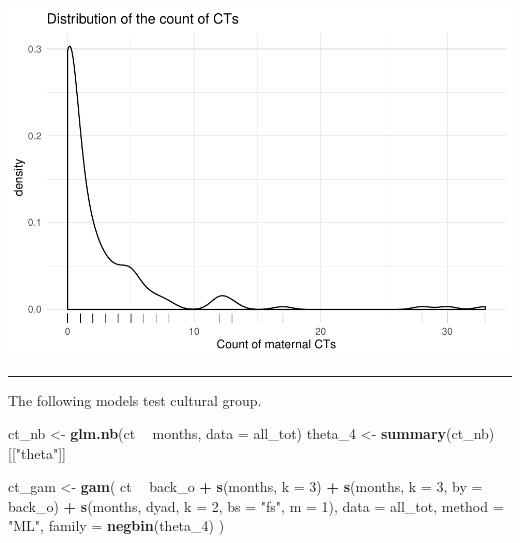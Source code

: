 \documentclass[]{article}
\newenvironment{Shaded}{\begin{snugshade}}{\end{snugshade}}
\newcommand{\DataTypeTok}[1]{\textcolor[rgb]{0.13,0.29,0.53}{#1}}
\newcommand{\DecValTok}[1]{\textcolor[rgb]{0.00,0.00,0.81}{#1}}
\newcommand{\KeywordTok}[1]{\textcolor[rgb]{0.13,0.29,0.53}{\textbf{#1}}}
\newcommand{\NormalTok}[1]{#1}
\newcommand{\OperatorTok}[1]{\textcolor[rgb]{0.81,0.36,0.00}{\textbf{#1}}}
\newcommand{\StringTok}[1]{\textcolor[rgb]{0.31,0.60,0.02}{#1}}
\begin{document}
\includegraphics{supplement_files/figure-latex/ct-1.pdf}

\begin{center}\rule{0.5\linewidth}{\linethickness}\end{center}

The following models test cultural group.

\begin{Shaded}
\begin{Highlighting}[]
\NormalTok{ct_nb <-}\StringTok{ }\KeywordTok{glm.nb}\NormalTok{(ct }\OperatorTok{~}\StringTok{ }\NormalTok{months, }\DataTypeTok{data =}\NormalTok{ all_tot)}
\NormalTok{theta_}\DecValTok{4}\NormalTok{ <-}\StringTok{ }\KeywordTok{summary}\NormalTok{(ct_nb)[[}\StringTok{"theta"}\NormalTok{]]}

\NormalTok{ct_gam <-}\StringTok{ }\KeywordTok{gam}\NormalTok{(}
\NormalTok{  ct }\OperatorTok{~}
\StringTok{    }\NormalTok{back_o }\OperatorTok{+}
\StringTok{    }\KeywordTok{s}\NormalTok{(months, }\DataTypeTok{k =} \DecValTok{3}\NormalTok{) }\OperatorTok{+}
\StringTok{    }\KeywordTok{s}\NormalTok{(months, }\DataTypeTok{k =} \DecValTok{3}\NormalTok{, }\DataTypeTok{by =}\NormalTok{ back_o) }\OperatorTok{+}
\StringTok{    }\KeywordTok{s}\NormalTok{(months, dyad, }\DataTypeTok{k =} \DecValTok{2}\NormalTok{, }\DataTypeTok{bs =} \StringTok{"fs"}\NormalTok{, }\DataTypeTok{m =} \DecValTok{1}\NormalTok{),}
  \DataTypeTok{data =}\NormalTok{ all_tot,}
  \DataTypeTok{method =} \StringTok{"ML"}\NormalTok{,}
  \DataTypeTok{family =} \KeywordTok{negbin}\NormalTok{(theta_}\DecValTok{4}\NormalTok{)}
\NormalTok{)}
\end{Highlighting}
\end{Shaded}
\end{document}
